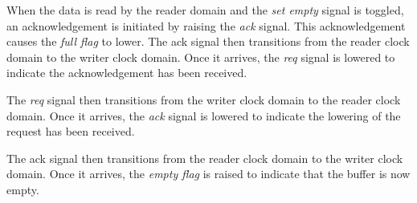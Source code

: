         When the data is read by the reader domain and the {\it set empty} signal is toggled, an acknowledgement is initiated by raising the {\it ack} signal. This acknowledgement causes the {\it full flag} to lower. The {ack} signal then transitions from the reader clock domain to the writer clock domain. Once it arrives, the {\it req} signal is lowered to indicate the acknowledgement has been received.

        The {\it req} signal then transitions from the writer clock domain to the reader clock domain. Once it arrives, the {\it ack} signal is lowered to indicate the lowering of the request has been received.

        The {ack} signal then transitions from the reader clock domain to the writer clock domain. Once it arrives, the {\it empty flag} is raised to indicate that the buffer is now empty.

